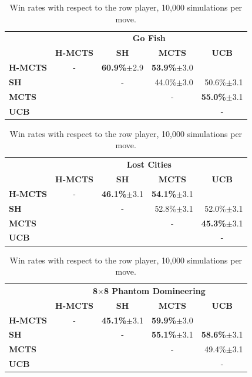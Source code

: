 \documentclass[a4paper]{llncs}
\begin{document}
\begin{table}[ht]
\centering
\setlength{\tabcolsep}{10pt}
\begin{tabular}{@{}lrrrr@{}}
\toprule
& \multicolumn{4}{c}{\textbf{Go Fish}} \\
& \multicolumn{1}{c}{\textbf{H-MCTS}} & \multicolumn{1}{c}{\textbf{SH}} & \multicolumn{1}{c}{\textbf{MCTS}} & \multicolumn{1}{c}{\textbf{UCB}} \\[1mm] \cmidrule(l){2-5} 
\textbf{H-MCTS} & \multicolumn{1}{c}{-}	& \textbf{60.9\%}$\pm$2.9 & \textbf{53.9\%}$\pm$3.0 &  \\ [.5mm] 
\textbf{SH}     & 	& \multicolumn{1}{c}{-} & 44.0\%$\pm$3.0 & 50.6\%$\pm$3.1 \\ [.5mm] 
\textbf{MCTS}   & 	&  & \multicolumn{1}{c}{-} & \textbf{55.0\%}$\pm$3.1 \\ [.5mm]
\textbf{UCB}	& 	&  & & \multicolumn{1}{c}{-} \\[.5mm] 
\end{tabular}
\begin{tabular}{@{}lrrrr@{}}
\toprule
& \multicolumn{4}{c}{\textbf{Lost Cities}} \\
& \multicolumn{1}{c}{\textbf{H-MCTS}} & \multicolumn{1}{c}{\textbf{SH}} & \multicolumn{1}{c}{\textbf{MCTS}} & \multicolumn{1}{c}{\textbf{UCB}} \\ [1mm] \cmidrule(l){2-5} 
\textbf{H-MCTS} & \multicolumn{1}{c}{-}	& \textbf{46.1\%}$\pm$3.1  & \textbf{54.1\%}$\pm$3.1  &  \\[.5mm] 
\textbf{SH}     &	& \multicolumn{1}{c}{-} & 52.8\%$\pm$3.1  & 52.0\%$\pm$3.1  \\[.5mm] 
\textbf{MCTS}   &	&  & \multicolumn{1}{c}{-} & \textbf{45.3\%}$\pm$3.1  \\[.5mm]
\textbf{UCB}	&	&  &  & \multicolumn{1}{c}{-} \\[.5mm]
\end{tabular}

\begin{tabular}{@{}lrrrr@{}}
\toprule
& \multicolumn{4}{c}{\textbf{8$\times$8 Phantom Domineering}}       \\
& \multicolumn{1}{c}{\textbf{H-MCTS}} & \multicolumn{1}{c}{\textbf{SH}} & \multicolumn{1}{c}{\textbf{MCTS}} & \multicolumn{1}{c}{\textbf{UCB}} \\ [1mm] \cmidrule(l){2-5} 
\textbf{H-MCTS} & \multicolumn{1}{c}{-}	& \textbf{45.1\%}$\pm$3.1 & \textbf{59.9\%}$\pm$3.0 &  	\\[.5mm] 
\textbf{SH}     &	&  \multicolumn{1}{c}{-} & \textbf{55.1\%}$\pm$3.1   & \textbf{58.6\%}$\pm$3.1 		\\[.5mm] 
\textbf{MCTS}   &	&  & \multicolumn{1}{c}{-} & 49.4\%$\pm$3.1  \\[.5mm] 
\textbf{UCB}	&	&  & & \multicolumn{1}{c}{-} \\[.5mm] \bottomrule
\end{tabular}

\vspace{2mm}
{\caption{Win rates with respect to the row player, 10,000 simulations per move.} \label{tab:results}}
\end{table}
\end{document}
